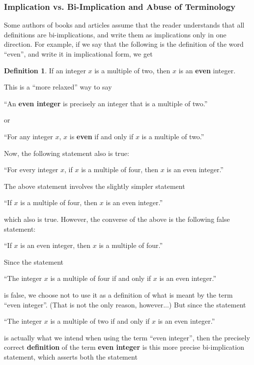 \documentclass{book}
\theoremstyle{definition}
\newtheorem{definition}[theorem]{Definition}
\begin{document}
\subsubsection{Implication vs. Bi-Implication and Abuse of Terminology}
Some authors of books and articles assume that the reader understands that all definitions are bi-implications, and write them as implications only in one direction.  For example, if we say that the following is the definition of the word ``even'', and write it in implicational form, we get 

\vspace{3mm}
\begin{definition} 
If an integer $x$ is a multiple of two, then $x$ is an {\bf even} integer.
\end{definition}
\vspace{3mm}

This is a ``more relaxed'' way to say 

``An {\bf even integer} is precisely an integer that is a multiple of two.''

or 

``For any integer $x$, $x$ is {\bf even} if and only if $x$ is a multiple of two.''

Now, the following statement also is true:  

``For every integer $x$, if $x$ is a multiple of four, then $x$ is an even integer.''

The above statement involves the slightly simpler statement 

``If $x$ is a multiple of four, then $x$ is an even integer.''

which also is true.  However, the converse of the above is the following false statement:  

``If $x$ is an even integer, then $x$ is a multiple of four.''  

Since the statement 

``The integer $x$ is a multiple of four if and only if $x$ is an even integer.''

is false, we choose not to use it as a definition of what is meant by the term ``even integer''.  (That is not the only reason, however...)  But since the statement 


``The integer $x$ is a multiple of two if and only if $x$ is an even integer.''

is actually what we intend when using the term ``even integer'', then the precisely correct {\bf definition} of the term {\bf even integer} is this more precise bi-implication statement, which asserts both the statement 
\end{document}
